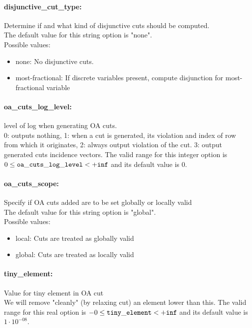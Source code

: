 \paragraph{disjunctive\_cut\_type:} Determine if and what kind of disjunctive cuts should be computed. $\;$ \\

The default value for this string option is "none".
\\ 
Possible values:
\begin{itemize}
   \item none: No disjunctive cuts.
   \item most-fractional: If discrete variables present, compute
disjunction for most-fractional variable
\end{itemize}

\paragraph{oa\_cuts\_log\_level:} level of log when generating OA cuts. $\;$ \\
 0: outputs nothing,
1: when a cut is generated,
its violation and index of row from which it
originates,
2: always output violation of the
cut.
3: output generated cuts incidence vectors. The valid range for this integer option is
$0 \le {\tt oa\_cuts\_log\_level } <  {\tt +inf}$
and its default value is $0$.


\paragraph{oa\_cuts\_scope:} Specify if OA cuts added are to be set globally or locally valid $\;$ \\

The default value for this string option is "global".
\\ 
Possible values:
\begin{itemize}
   \item local: Cuts are treated as globally valid
   \item global: Cuts are treated as locally valid
\end{itemize}

\paragraph{tiny\_element:} Value for tiny element in OA cut $\;$ \\
 We will remove "cleanly" (by relaxing cut) an
element lower than this. The valid range for this real option is 
$-0 \le {\tt tiny\_element } <  {\tt +inf}$
and its default value is $1 \cdot 10^{-08}$.


